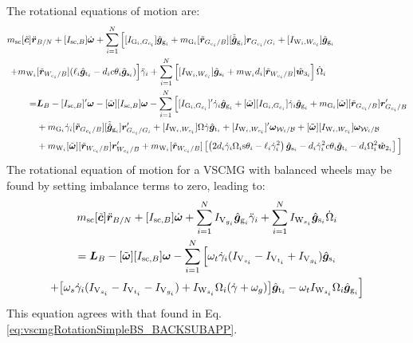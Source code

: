 The rotational equations of motion are:
\begin{equation}
	\begin{split}
		m_{\text{\text{sc}}}[\tilde{\bm{c}}]\ddot{\bm r}&_{B/N} + [I_{\text{sc},B}]\dot{\bm\omega}
		+\sum\limits_{i=1}^{N} \Big[ [I_{\text{G}_i,G_{c_i}}]\hat{\bm{g}}_{\text{g}_i} + m_{\text{G}_i}[\tilde{\bm{r}}_{G_{c_i}/B}][\tilde{\hat{\bm g}}_{\text{g}_i}]\bm{r}_{G_{c_i}/G_i} + [I_{\text{W}_i,W_{c_i}}]\hat{\bm{g}}_{\text{g}_i} 
		\\
		+ m_{\text{W}_i}&[\tilde{\bm{r}}_{W_{c_i}/B}]( \ell_i\hat{\bm{g}}_{\text{t}_i} - d_ic\theta_i\hat{\bm{g}}_{\text{s}_i}) \Big] \ddot{\gamma}_i
		+\sum\limits_{i=1}^{N} \left[ [I_{\text{W}_i,W_{c_i}}]\hat{\bm{g}}_{\text{s}_i} + m_{\text{W}_i}d_i[\tilde{\bm{r}}_{W_{c_i}/B}]\hat{\bm w}_{3_i} \right] \dot{\Omega}_i
		\\
		=& \bm{L}_B - [I_{\text{sc},B}]'\bm{\omega} - [\tilde{\bm\omega}][I_{\text{sc},B}]\bm\omega
		-\sum\limits_{i=1}^{N} \Big[ 
		[I_{\text{G}_i,G_{c_i}}]'\dot{\gamma}_i\hat{\bm{g}}_{\text{g}_i} + [\tilde{\bm\omega}][I_{\text{G}_i,G_{c_i}}]\dot{\gamma}_i\hat{\bm{g}}_{\text{g}_i} + m_{\text{G}_i}[\tilde{\bm{\omega}}][\tilde{\bm{r}}_{G_{c_i}/B}]\bm{r}'_{G_{c_i}/B}
		\\&+ m_{\text{G}_i}\dot{\gamma}_i[\tilde{\bm{r}}_{G_{c_i}/B}][\tilde{\hat{\bm g}}_{\text{g}_i}]\bm{r}'_{G_{c_i}/G_i}
		+ [I_{\text{W}_i,W_{c_i}}]\Omega\dot{\gamma}\hat{\bm{g}}_{\text{t}_i} + [I_{\text{W}_i,W_{c_i}}]'\bm{\omega}_{\mathcal{W}_i/\cal B} + [\tilde{\bm{\omega}}][I_{\text{W}_i,W_{c_i}}]\bm{\omega}_{\mathcal{W}_i/\cal B} 
		\\
		&+ m_{\text{W}_i}[\tilde{\bm{\omega}}][\tilde{\bm{r}}_{W_{c_i}/B}]\bm{r}'_{W_{c_i}/B} + m_{\text{W}_i}[\tilde{\bm{r}}_{W_{c_i}/B}]\left[\left(2d_i\dot{\gamma}_i\Omega_i\text{s}\theta_i - \ell_i\dot{\gamma}_i^2\right)\hat{\bm{g}}_{\text{s}_i} - d_i\dot{\gamma}_i^2c\theta_i\hat{\bm{g}}_{\text{t}_i} - d_i\Omega_i^2 \hat{\bm{w}}_{2_i} \right]
		\Big]
	\end{split}
\label{eq:rotation}
\end{equation}
The rotational equation of motion for a VSCMG with balanced wheels may be found by setting imbalance terms to zero, leading to:
\begin{multline}
m_{\text{\text{sc}}}[\tilde{\bm{c}}]\ddot{\bm r}_{B/N} + [I_{\text{sc},B}]\dot{\bm\omega}
+\sum\limits_{i=1}^{N}I_{\text{V}_{g_i}}\hat{\bm{g}}_{\text{g}_i} \ddot{\gamma}_i
+\sum\limits_{i=1}^{N}I_{\text{W}_{s_i}}\hat{\bm{g}}_{\text{s}_i} \dot{\Omega}_i
\\
= \bm{L}_B - [\tilde{\bm\omega}][I_{\text{sc},B}]\bm\omega
-\sum\limits_{i=1}^{N} \Big[ 
\omega_t\dot{\gamma}_i(I_{\text{V}_{s_i}}-I_{\text{V}_{t_i}}+I_{\text{V}_{g_i}}) \hat{\bm{g}}_{\text{s}_i}
\\+ \big[ \omega_s\dot{\gamma}_i(I_{\text{V}_{s_i}}-I_{\text{V}_{t_i}}-I_{\text{V}_{g_i}}) + I_{\text{W}_{s_i}}\Omega_i(\dot{\gamma} + \omega_g) \big]\hat{\bm{g}}_{\text{t}_i}
-\omega_tI_{\text{W}_{s_i}}\Omega_i\hat{\bm{g}}_{\text{g}_i} \Big]
\label{eq:vscmgRotationSimple}
\end{multline}
This equation agrees with that found in Eq.  \ref{eq:vscmgRotationSimpleBS_BACKSUBAPP}. 


